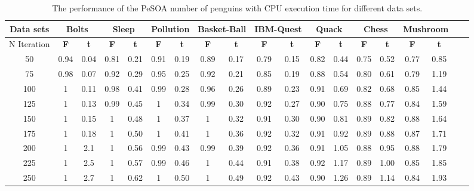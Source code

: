 \documentclass[preprint,12pt]{elsarticle}
\begin{document}
\begin{landscape}

\begin{table}[b]
\small
\caption{The performance of the PeSOA number of penguins with CPU execution time for different data sets.}
\label{sample-table1}
\begin{tabular}{c c c  c c c c c c c c c c c c c c c c}
\toprule
\textbf{Data sets} &  \multicolumn{2}{c}{Bolts} & \multicolumn{2}{c}{Sleep} & \multicolumn{2}{c}{Pollution}& \multicolumn{2}{c}{Basket-Ball}& \multicolumn{2}{c}{IBM-Quest}& \multicolumn{2}{c}{Quack}& \multicolumn{2}{c}{Chess}& \multicolumn{2}{c}{Mushroom}\\
\midrule
{N Iteration}   & \textbf{F}  & \textbf{t}  & \textbf{F}  & \textbf{t} & \textbf{F}  & \textbf{t} & \textbf{F}  & \textbf{t} & \textbf{F}  & \textbf{t} & \textbf{F}  & \textbf{t} & \textbf{F}  & \textbf{t} & \textbf{F}  & \textbf{t} \\\hline
50		&	  0.94 & 0.04 &	0.81 & 0.21		&		0.91 & 	0.19 	&		0.89 & 0.17	  	&	 0.79 &	0.15	&  0.82 & 0.44  &	0.75 &	0.52  &	0.77 & 	0.85 \\\hline
75		&		0.98 & 0.07 &	0.92 & 0.29 	&		0.95 & 	0.25 	&		0.92 & 0.21	  	&	 0.85 & 0.19	&  0.88 & 0.54  &	0.80 &	0.61  &	0.79 &	1.19  \\\hline
100		&		1    & 0.11	&	0.98 & 0.41 	&		0.99 & 	0.28	&		0.96 & 0.26			&	 0.89 &	0.23	&  0.91 & 0.69  &	0.82 &	0.68  &	0.85 &	1.44   \\\hline
125		&		1    & 0.13	&	0.99 & 0.45 	&		1    & 	0.34	&		0.99 & 0.30			&	 0.92 &	0.27  &  0.90 & 0.75  &	0.88 &  0.77  &	0.84 & 	1.59  \\\hline
150		&	  1    & 0.15	&	1    & 0.48 	&		1    & 	0.37	&		1    & 0.32			&	 0.91 &	0.30  &  0.90 & 0.81  &	0.89 &  0.82  &	0.88 & 	1.64 \\\hline
175		&		1    & 0.18	&	1    & 0.50	  &		1    & 	0.41	&		1    & 0.36		  &	 0.92 &	0.32  &  0.91 & 0.92  &	0.89 &  0.88  & 0.87& 	1.71 \\\hline
200		&		1    & 2.1	&	1    & 0.56 	&		0.99 & 	0.43	&		0.99 & 0.39			&	 0.92 &	0.36  &  0.91 & 1.05  &	0.88 &	0.95  &	0.88 & 	1.79 \\\hline
225		&		1    & 2.5  &	1    & 0.57 	&		0.99 & 	0.46	&		1    & 0.44	  	&	 0.91 &	0.38  &  0.92 & 1.17  &	0.89 &	1.00  &	0.85 & 	1.85 \\\hline
250		&		1    & 2.7	&	1    & 0.62 	&		1    & 	0.50	&		1    & 0.49			&	 0.92 &	0.43  &  0.90 & 1.26  &	0.89 &	1.14  &	0.84 & 	1.93 \\\hline

\end{tabular}
\end{table}
\end{landscape}
\end{document}
